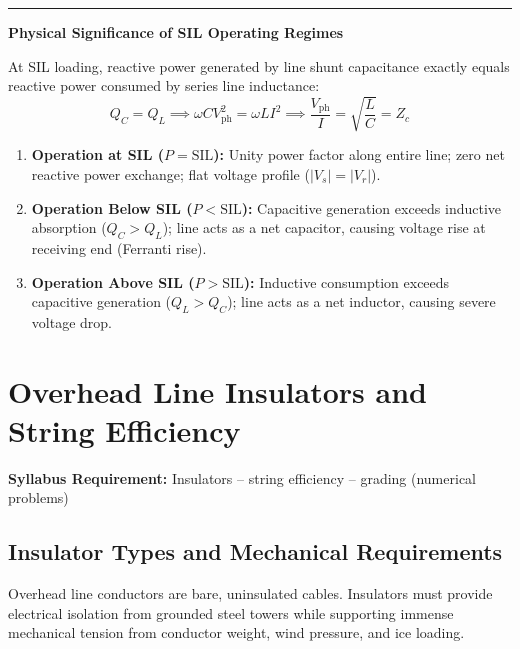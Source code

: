 \documentclass[11pt,a4paper]{article}
\newcommand{\concept}[1]{%
  \vspace{3pt}\noindent\textcolor{AnthGreen}{\rule{3.5pt}{10pt}}\enspace
  \textbf{\sffamily\color{AnthDark}#1}\par\vspace{2pt}%
}
\newcommand{\syllabusitem}[1]{%
  \begin{tcolorbox}[enhanced, colback=AnthOrange!8, colframe=AnthOrange, boxrule=0.4pt, arc=3pt, left=7pt, right=7pt, top=3pt, bottom=3pt]
    \small\sffamily\textbf{\color{AnthOrange}Syllabus Requirement:} #1
  \end{tcolorbox}
}
\begin{document}
\concept{Physical Significance of SIL Operating Regimes}
At SIL loading, reactive power generated by line shunt capacitance exactly equals reactive power consumed by series line inductance:
\begin{equation}
  Q_C = Q_L \implies \omega C V_{\text{ph}}^2 = \omega L I^2 \implies \frac{V_{\text{ph}}}{I} = \sqrt{\frac{L}{C}} = Z_c
\end{equation}
\begin{enumerate}
  \item \textbf{Operation at SIL ($P = \text{SIL}$):} Unity power factor along entire line; zero net reactive power exchange; flat voltage profile ($|V_s| = |V_r|$).
  \item \textbf{Operation Below SIL ($P < \text{SIL}$):} Capacitive generation exceeds inductive absorption ($Q_C > Q_L$); line acts as a net capacitor, causing voltage rise at receiving end (Ferranti rise).
  \item \textbf{Operation Above SIL ($P > \text{SIL}$):} Inductive consumption exceeds capacitive generation ($Q_L > Q_C$); line acts as a net inductor, causing severe voltage drop.
\end{enumerate}

\clearpage
\section{Overhead Line Insulators and String Efficiency}

\syllabusitem{Insulators – string efficiency – grading (numerical problems)}

\subsection{Insulator Types and Mechanical Requirements}

Overhead line conductors are bare, uninsulated cables. Insulators must provide electrical isolation from grounded steel towers while supporting immense mechanical tension from conductor weight, wind pressure, and ice loading.
\end{document}
